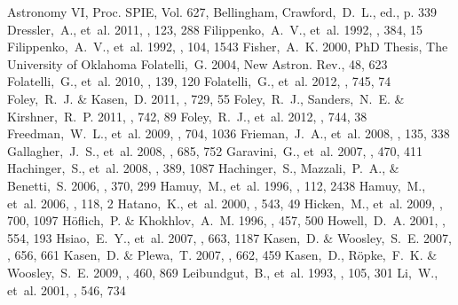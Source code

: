 \documentclass[apj]{emulateapj-rtx4}
\begin{document}
\begin{thebibliography}{}
{    Astronomy VI}, Proc. SPIE, Vol. 627, Bellingham, Crawford,~D.~L.,
  ed., p. 339 
 Dressler,~A.,
  et~al. 2011, \pasp, 123, 288
 Filippenko,~A.~V.,
  et~al. 1992, \apjl, 384, 15
 Filippenko,~A.~V.,
  et~al. 1992, \aj, 104, 1543
 Fisher,~A.~K. 2000, PhD Thesis, The
  University of Oklahoma 
 Folatelli,~G. 2004, New Astron. Rev.,
  48, 623 
 Folatelli,~G.,
  et~al. 2010, \aj, 139, 120
 Folatelli,~G.,
  et~al. 2012, \apj, 745, 74
 Foley,~R.~J. \&
  Kasen,~D. 2011, \apj, 729, 55
 Foley,~R.~J.,
  Sanders,~N.~E. \& Kirshner,~R.~P. 2011, \apj, 742, 89
 Foley,~R.~J., et~al. 2012, \apj,
  744, 38
 Freedman,~W.~L.,
  et~al. 2009, \apj, 704, 1036
 Frieman,~J.~A., et~al. 2008,
  \aj, 135, 338
 Gallagher,~J.~S.,
  et~al. 2008, \apj, 685, 752 
 Garavini,~G., et~al. 2007,
  \aap, 470, 411
 Hachinger,~S.,
  et~al. 2008, \mnras, 389, 1087
 Hachinger,~S.,
  Mazzali,~P.~A., \& Benetti,~S. 2006, \mnras, 370, 299
 Hamuy,~M., et~al. 1996, \aj,
  112, 2438
 Hamuy,~M., et~al. 2006, \pasp,
118, 2 
 Hatano,~K., et~al. 2000, \apjl,
  543, 49
 Hicken,~M., et~al. 2009, \apj,
  700, 1097
 H\"oflich,~P.
  \& Khokhlov,~A.~M. 1996, \apj, 457, 500
 Howell,~D.~A. 2001, \apjl, 554, 193
 Hsiao,~E.~Y., et~al. 2007, \apj,
  663, 1187
 Kasen,~D. \&
  Woosley,~S.~E. 2007, \apj, 656, 661
 Kasen,~D. \&
  Plewa,~T. 2007, \apj, 662, 459
 Kasen,~D.,
  R\"opke,~F.~K. \& Woosley,~S.~E. 2009, \nat, 460, 869
 Leibundgut,~B.,
  et~al. 1993, \aj, 105, 301
 Li,~W., et~al. 2001, \apj, 546, 734

\end{thebibliography}
\end{document}
